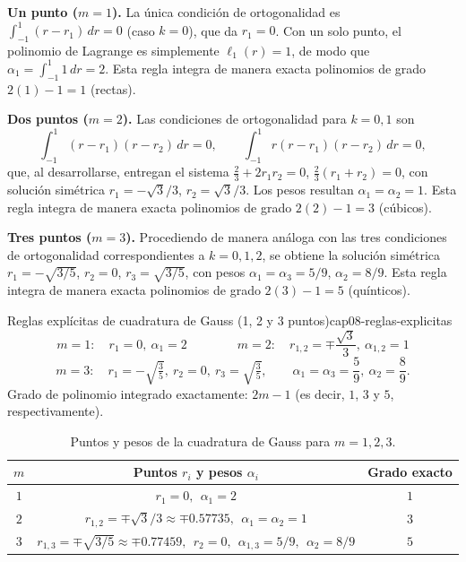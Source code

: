 \textbf{Un punto ($m=1$).} La única condición de ortogonalidad es $\int_{-1}^1 (r-r_1)\,dr=0$ (caso $k=0$), que da $r_1=0$. Con un solo punto, el polinomio de Lagrange es simplemente $\ell_1(r)=1$, de modo que $\alpha_1=\int_{-1}^1 1\,dr = 2$. Esta regla integra de manera exacta polinomios de grado $2(1)-1=1$ (rectas).

\textbf{Dos puntos ($m=2$).} Las condiciones de ortogonalidad para $k=0,1$ son
\[
\int_{-1}^1 (r-r_1)(r-r_2)\,dr=0, \qquad \int_{-1}^1 r(r-r_1)(r-r_2)\,dr=0 ,
\]
que, al desarrollarse, entregan el sistema $\tfrac23+2r_1r_2=0$, $\tfrac23(r_1+r_2)=0$, con solución simétrica $r_1=-\sqrt{3}/3$, $r_2=\sqrt3/3$. Los pesos resultan $\alpha_1=\alpha_2=1$. Esta regla integra de manera exacta polinomios de grado $2(2)-1=3$ (cúbicos).

\textbf{Tres puntos ($m=3$).} Procediendo de manera análoga con las tres condiciones de ortogonalidad correspondientes a $k=0,1,2$, se obtiene la solución simétrica $r_1=-\sqrt{3/5}$, $r_2=0$, $r_3=\sqrt{3/5}$, con pesos $\alpha_1=\alpha_3=5/9$, $\alpha_2=8/9$. Esta regla integra de manera exacta polinomios de grado $2(3)-1=5$ (quínticos).

\begin{ecnimportante}{Reglas explícitas de cuadratura de Gauss (1, 2 y 3 puntos)}{cap08-reglas-explicitas}
\[
m=1:\quad r_1=0,\ \alpha_1=2 \qquad\qquad
m=2:\quad r_{1,2}=\mp\frac{\sqrt3}{3},\ \alpha_{1,2}=1
\]
\[
m=3:\quad r_1=-\sqrt{\tfrac35},\ r_2=0,\ r_3=\sqrt{\tfrac35}, \qquad \alpha_1=\alpha_3=\frac59,\ \alpha_2=\frac89 .
\]
Grado de polinomio integrado exactamente: $2m-1$ (es decir, $1$, $3$ y $5$, respectivamente).
\end{ecnimportante}

\begin{table}[htbp]
\centering
\caption{Puntos y pesos de la cuadratura de Gauss para $m=1,2,3$.}
\label{tab:cap08-puntos-gauss}
\begin{tabular}{@{}ccccc@{}}
\toprule
$m$ & \multicolumn{3}{c}{Puntos $r_i$ y pesos $\alpha_i$} & Grado exacto \\
\midrule
$1$ & \multicolumn{3}{c}{$r_1=0,\ \ \alpha_1=2$} & $1$ \\
\addlinespace
$2$ & \multicolumn{3}{c}{$r_{1,2}=\mp\sqrt{3}/3\approx\mp0.57735,\ \ \alpha_1=\alpha_2=1$} & $3$ \\
\addlinespace
$3$ & \multicolumn{3}{c}{$r_{1,3}=\mp\sqrt{3/5}\approx\mp0.77459,\ \ r_2=0,\ \ \alpha_{1,3}=5/9,\ \ \alpha_2=8/9$} & $5$ \\
\bottomrule
\end{tabular}
\end{table}

